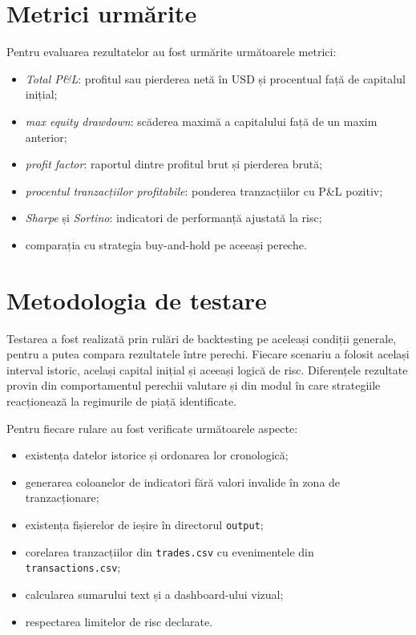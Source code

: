 \section{Metrici urmărite}
\label{cap:cap4:metrici}

Pentru evaluarea rezultatelor au fost urmărite următoarele metrici:
\begin{itemize}
    \item \textit{Total P\&L}: profitul sau pierderea netă în USD și procentual față de capitalul inițial;
    \item \textit{max equity drawdown}: scăderea maximă a capitalului față de un maxim anterior;
    \item \textit{profit factor}: raportul dintre profitul brut și pierderea brută;
    \item \textit{procentul tranzacțiilor profitabile}: ponderea tranzacțiilor cu P\&L pozitiv;
    \item \textit{Sharpe} și \textit{Sortino}: indicatori de performanță ajustată la risc;
    \item comparația cu strategia buy-and-hold pe aceeași pereche.
\end{itemize}

\section{Metodologia de testare}
\label{cap:cap4:metodologie_testare}

Testarea a fost realizată prin rulări de backtesting pe aceleași condiții generale, pentru a putea compara rezultatele între perechi. Fiecare scenariu a folosit același interval istoric, același capital inițial și aceeași logică de risc. Diferențele rezultate provin din comportamentul perechii valutare și din modul în care strategiile reacționează la regimurile de piață identificate.

Pentru fiecare rulare au fost verificate următoarele aspecte:
\begin{itemize}
    \item existența datelor istorice și ordonarea lor cronologică;
    \item generarea coloanelor de indicatori fără valori invalide în zona de tranzacționare;
    \item existența fișierelor de ieșire în directorul \texttt{output};
    \item corelarea tranzacțiilor din \texttt{trades.csv} cu evenimentele din \texttt{transactions.csv};
    \item calcularea sumarului text și a dashboard-ului vizual;
    \item respectarea limitelor de risc declarate.
\end{itemize}

